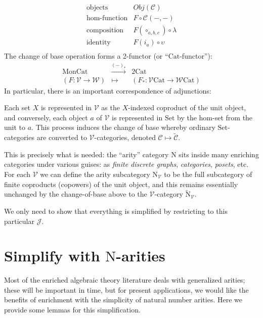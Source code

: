 \documentclass[a4paper,UKenglish]{article}
\theoremstyle{definition}
\def\ld{\rotatebox[origin=c]{-90}{$\dashv$}} %
\newcommand{\Set}{\mathrm{Set}}
\newcommand{\Cat}{\mathrm{Cat}}
\newcommand{\Mon}{\mathrm{Mon}}
\newcommand{\NN}{\mathrm{N}}
\newcommand{\V}{\mathscr{V}}
\newcommand{\W}{\mathscr{W}}
\newcommand{\C}{\mathscr{C}}
\newcommand{\J}{\mathscr{J}}
\begin{document}
\[\begin{array}{rl}
\text{objects} & Obj(\C)\\
\text{hom-function} & F \circ \C(-,-)\\
\text{composition} & F(\circ_{a,b,c}) \circ \lambda\\
\text{identity} & F(i_a) \circ \upsilon\\
\end{array}\]
The change of base operation forms a 2-functor (or ``$\Cat$-functor''):
\[\begin{array}{ccc}
\Mon\Cat & \xrightarrow{(-)_*} & 2\Cat\\
(F: \V\to\W) & \mapsto & (F_*: \V\Cat\to\W\Cat)
\end{array}\]
In particular, there is an important correspondence of adjunctions:
\begin{center}
\end{center}

Each set $X$ is represented in $\V$ as the $X$-indexed coproduct of the unit object, and conversely, each object $a$ of $\V$ is represented in $\Set$ by the hom-set from the unit to $a$. This process induces the change of base whereby ordinary $\Set$-categories are converted to $\V$-categories, denoted $\C \mapsto \tilde{\C}$.

This is precisely what is needed: the ``arity'' category $\NN$ sits inside many enriching categories under various guises: as \textit{finite discrete graphs}, \textit{categories}, \textit{posets}, etc. For each $\V$ we can define the arity subcategory $\NN_\V$ to be the full subcategory of finite coproducts (copowers) of the unit object, and this remains essentially unchanged by the change-of-base above to the $\V$-category $\tilde{\NN}_\V$.

We only need to show that everything is simplified by restricting to this particular $\J$.

\section{Simplify with $\NN$-arities}

Most of the enriched algebraic theory literature deals with generalized arities; these will be important in time, but for present applications, we would like the benefits of enrichment with the simplicity of natural number arities. Here we provide some lemmas for this simplification.
\end{document}
